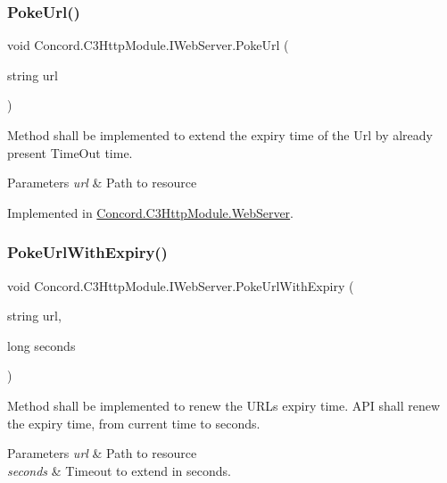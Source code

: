 \subsubsection{\texorpdfstring{PokeUrl()}{PokeUrl()}}
{\footnotesize\ttfamily void Concord.\+C3\+Http\+Module.\+I\+Web\+Server.\+Poke\+Url (\begin{DoxyParamCaption}\item[{string}]{url }\end{DoxyParamCaption})}



Method shall be implemented to extend the expiry time of the Url by already present Time\+Out time. 


\begin{DoxyParams}{Parameters}
{\em url} & Path to resource\\
\hline
\end{DoxyParams}


Implemented in \mbox{\hyperlink{class_concord_1_1_c3_http_module_1_1_web_server_ad58516396d74972ad8f1005c889e1379}{Concord.\+C3\+Http\+Module.\+Web\+Server}}.

\mbox{\label{interface_concord_1_1_c3_http_module_1_1_i_web_server_a4d16137e82bd2416f07c86701d8506ff}} 
\subsubsection{\texorpdfstring{PokeUrlWithExpiry()}{PokeUrlWithExpiry()}}
{\footnotesize\ttfamily void Concord.\+C3\+Http\+Module.\+I\+Web\+Server.\+Poke\+Url\+With\+Expiry (\begin{DoxyParamCaption}\item[{string}]{url,  }\item[{long}]{seconds }\end{DoxyParamCaption})}



Method shall be implemented to renew the U\+R\+Ls expiry time. A\+PI shall \textquotesingle{}renew\textquotesingle{} the expiry time, from current time to seconds. 


\begin{DoxyParams}{Parameters}
{\em url} & Path to resource\\
\hline
{\em seconds} & Timeout to extend in seconds.\\
\hline
\end{DoxyParams}


